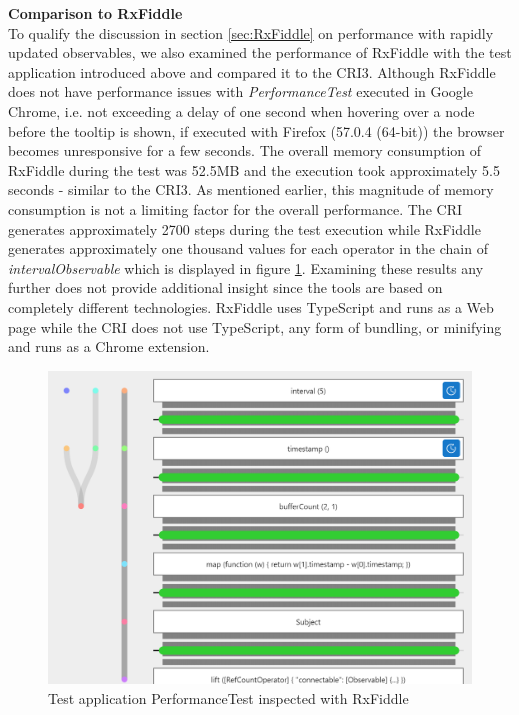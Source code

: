 	\noindent\textbf{Comparison to RxFiddle}\\
	To qualify the discussion in section \ref{sec:RxFiddle} on performance with rapidly updated observables, we also examined the performance of RxFiddle with the test application introduced above and compared it to the CRI3. Although RxFiddle does not have performance issues with \emph{PerformanceTest} executed in Google Chrome, i.e. not exceeding a delay of one second when hovering over a node before the tooltip is shown, if executed with Firefox (57.0.4 (64-bit)) the browser becomes unresponsive for a few seconds. The overall memory consumption of RxFiddle during the test was 52.5MB and the execution took approximately 5.5 seconds - similar to the CRI3. As mentioned earlier, this magnitude of memory consumption is not a limiting factor for the overall performance. The CRI generates approximately 2700 steps during the test execution while RxFiddle generates approximately one thousand values for each operator in the chain of \emph{intervalObservable} which is displayed in figure \ref{fig:RxFiddlePerformance}. Examining these results any further does not provide additional insight since the tools are based on completely different technologies. RxFiddle uses TypeScript and runs as a Web page while the CRI does not use TypeScript, any form of bundling, or minifying and runs as a Chrome extension.
	\begin{figure}[!h]
		\centering
		\includegraphics[scale=0.7,trim=0 0 0 0]{gfx/RxFiddleWithTimer.png}
		\caption{Test application PerformanceTest inspected with RxFiddle}
		\label{fig:RxFiddlePerformance}
	\end{figure}
	
